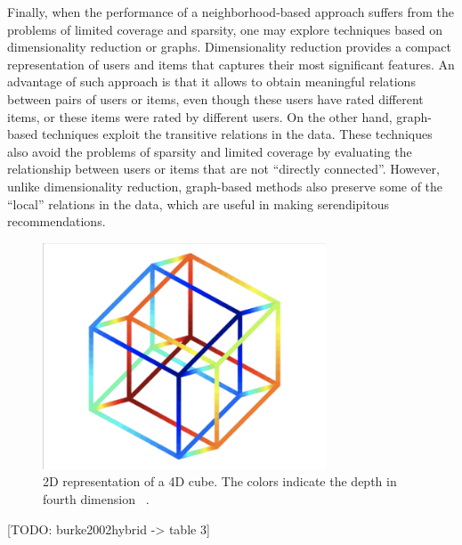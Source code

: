 Finally, when the performance of a neighborhood-based approach suffers from the problems of limited coverage and sparsity, one may explore techniques based on dimensionality reduction or graphs. Dimensionality reduction provides a compact representation of users and items that captures their most significant features. An advantage of such approach is that it allows to obtain meaningful relations between pairs of users or items, even though these users have rated different items, or these items were rated by different users. On the other hand, graph-based techniques exploit the transitive relations in the data. These techniques also avoid the problems of sparsity and limited coverage by evaluating the relationship between users or items that are not “directly connected”. However, unlike dimensionality reduction, graph-based methods also preserve some of the “local” relations in the data, which are useful in making serendipitous recommendations.

 \begin{figure}[!ht]
	\centering
	\includegraphics[width=0.75\textwidth]{figures/DimensionalityReduction.png}
	\caption{2D representation of a 4D cube. The colors indicate the depth in fourth dimension ~\parencite{lee2007nonlinear}.}
	\label{fig:embedding-projection-example}
\end{figure}

[TODO: burke2002hybrid -> table 3]


